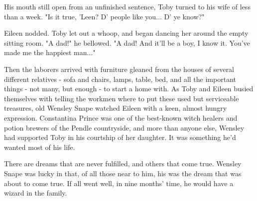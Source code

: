 His mouth still open from an unfinished sentence, Toby turned to his wife of less than a week. "Is it true, 'Leen? D' people like you... D' ye know?"

Eileen nodded. Toby let out a whoop, and began dancing her around the empty sitting room. "A dad!" he bellowed. "A dad! And it'll be a boy, I know it. You've made me the happiest man..."

Then the laborers arrived with furniture gleaned from the houses of several different relatives - sofa and chairs, lamps, table, bed, and all the important things - not many, but enough - to start a home with. As Toby and Eileen busied themselves with telling the workmen where to put these used but serviceable treasures, old Wensley Snape watched Eileen with a keen, almost hungry expression. Constantina Prince was one of the best-known witch healers and potion brewers of the Pendle countryside, and more than anyone else, Wensley had supported Toby in his courtship of her daughter. It was something he'd wanted most of his life.

There are dreams that are never fulfilled, and others that come true. Wensley Snape was lucky in that, of all those near to him, his was the dream that was about to come true. If all went well, in nine months' time, he would have a wizard in the family.
